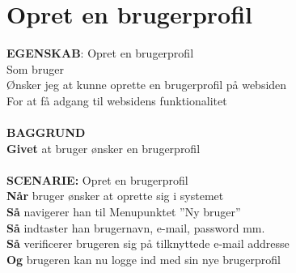 \section{Opret en brugerprofil}
{\color{blue}\textbf{EGENSKAB}:} Opret en brugerprofil \\
Som bruger \\
Ønsker jeg at kunne oprette en brugerprofil på websiden \\
For at få adgang til websidens funktionalitet\\ \\
{\color{blue}\textbf{BAGGRUND}} \\
{\color{blue}\textbf{Givet}} at bruger ønsker en brugerprofil \\\\
{\color{blue}\textbf{SCENARIE:}} Opret en brugerprofil \\
{\color{blue}\textbf{Når}} bruger ønsker at oprette sig i systemet \\
{\color{blue}\textbf{Så}} navigerer han til Menupunktet ”Ny bruger” \\
{\color{blue}\textbf{Så}} indtaster han brugernavn, e-mail, password mm.\\
{\color{blue}\textbf{Så}} verificerer brugeren sig på tilknyttede e-mail addresse\\
{\color{blue}\textbf{Og}} brugeren kan nu logge ind med sin nye brugerprofil